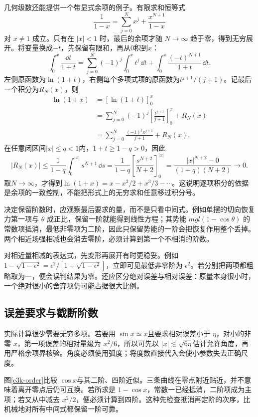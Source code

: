 几何级数还能提供一个带显式余项的例子。有限求和恒等式
\[
 \frac1{1-x}=\sum_{j=0}^{N}x^j+\frac{x^{N+1}}{1-x}
\]
对 $x\ne1$ 成立。只有在 $|x|<1$ 时，最后的余项才随 $N\to\infty$ 趋于零，得到无穷展开。将变量换成$-t$，先保留有限和，再从$0$积到$x$：
\[
\int_0^x\frac{\dd t}{1+t}
=\sum_{j=0}^{N}(-1)^j\int_0^xt^j\,\dd t
+\int_0^x\frac{(-t)^{N+1}}{1+t}\,\dd t.
\]
左侧原函数为$\ln(1+t)$，右侧每个多项式项的原函数为$t^{j+1}/(j+1)$。记最后一个积分为$R_N(x)$，则
\begin{align*}
\ln(1+x)
&=[\ln(1+t)]_0^x\\
&=\sum_{j=0}^{N}(-1)^j
\left[\frac{t^{j+1}}{j+1}\right]_0^x+R_N(x)\\
&=\sum_{j=0}^{N}\frac{(-1)^jx^{j+1}}{j+1}+R_N(x).
\end{align*}
在任意闭区间$|x|\le q<1$内，$1+t\ge1-q>0$，因此
\[
|R_N(x)|\le\frac1{1-q}\int_0^{|x|}s^{N+1}\,\dd s
=\frac1{1-q}\left[\frac{s^{N+2}}{N+2}\right]_0^{|x|}
=\frac{|x|^{N+2}-0}{(1-q)(N+2)}\longrightarrow0.
\]
取$N\to\infty$，才得到$\ln(1+x)=x-x^2/2+x^3/3-\cdots$。这说明逐项积分的依据是余项的一致控制，不能把形式上的无穷求和任意移过积分号。

决定保留阶数时，应观察最后要求的量，而不是只看中间式。例如单摆的切向恢复力第一项与 $\theta$ 成正比，保留一阶就能得到线性方程；其势能 $mgl(1-\cos\theta)$ 的常数项抵消，最低非零项为二阶，因此只保留势能的一阶会把恢复作用整个丢掉。两个相近场强相减也会消去零阶，必须计算到第一个不相消的阶数。

对相近量相减的表达式，先变形再展开有时更稳妥。例如
$1-\sqrt{1-\epsilon^2}=\epsilon^2/[1+\sqrt{1-\epsilon^2}]$，立即可见最低非零阶为 $\epsilon^2$。若分别把两项都粗略取为一，便会误判结果为零。还应区分绝对误差与相对误差：原量本身很小时，一个绝对很小的舍弃项仍可能占据很大比例。

\subsection{误差要求与截断阶数}
实际计算很少需要无穷多项。若要用 $\sin x\simeq x$且要求相对误差小于 $\eta$，对小的非零 $x$，第一项误差的相对量级为 $x^2/6$，所以可先以 $|x|\lesssim\sqrt{6\eta}$估计允许角度，再用严格余项界核验。角度必须使用弧度；将度数直接代入会使小参数失去正确尺度。

图\ref{c3k-order}比较 $\cos x$与其二阶、四阶近似。三条曲线在零点附近贴近，并不意味着离开零点后仍可互换。若所求是 $1-\cos x$，常数一已经抵消，二阶项成为主项；若又从中减去 $x^2/2$，便必须计算到四阶。这种先检查抵消再定阶的次序，比机械地对所有中间式都保留一阶可靠。


